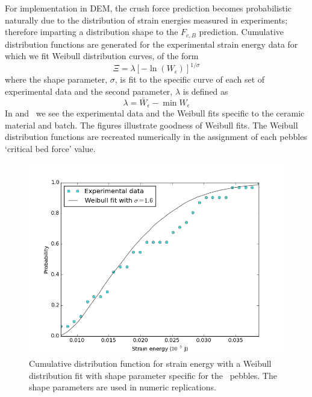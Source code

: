 \FloatBarrier

For implementation in DEM, the crush force prediction becomes probabilistic naturally due to the distribution of strain energies measured in experiments; therefore imparting a distribution shape to the $F_{c,B}$ prediction. Cumulative distribution functions are generated for the experimental strain energy data for which we fit Weibull distribution curves, of the form
\begin{equation}
	\Xi = \lambda\left[-\ln(W_\epsilon)\right]^{1/\sigma}
\end{equation}
where the shape parameter, $\sigma$, is fit to the specific curve of each set of experimental data and the second parameter, $\lambda$ is defined as
\[
\lambda = \bar{W}_\epsilon - \min W_\epsilon
\]
In  and~ we see the experimental data and the Weibull fits specific to the ceramic material and batch. The figures illustrate goodness of Weibull fits. The Weibull distribution functions are recreated numerically in the assignment of each pebbles `critical bed force' value. 



\begin{figure}[ht]
\centering
    \includegraphics[width=\doubleimagewidth]{figures/fzk-w-cdf-fit.png}
    \caption{Cumulative distribution function for strain energy with a Weibull distribution fit with shape parameter specific for the \lis~pebbles. The shape parameters are used in numeric replications.}
    \label{fig:fzk-w-cdf}
\end{figure}

